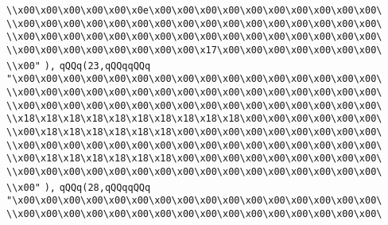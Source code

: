 \verb|\\x00\x00\x00\x00\x00\x0e\x00\x00\x00\x00\x00\x00\x00\x00\x00\x00\|\newline
\verb|\\x00\x00\x00\x00\x00\x00\x00\x00\x00\x00\x00\x00\x00\x00\x00\x00\|\newline
\verb|\\x00\x00\x00\x00\x00\x00\x00\x00\x00\x00\x00\x00\x00\x00\x00\x00\|\newline
\verb|\\x00\x00\x00\x00\x00\x00\x00\x00\x17\x00\x00\x00\x00\x00\x00\x00\|\newline
\verb|\\x00"|\newline
\verb|),|\newline
\verb|qQQq(23,qQQqqQQq|\newline
\verb|"\x00\x00\x00\x00\x00\x00\x00\x00\x00\x00\x00\x00\x00\x00\x00\x00\|\newline
\verb|\\x00\x00\x00\x00\x00\x00\x00\x00\x00\x00\x00\x00\x00\x00\x00\x00\|\newline
\verb|\\x00\x00\x00\x00\x00\x00\x00\x00\x00\x00\x00\x00\x00\x00\x00\x00\|\newline
\verb|\\x18\x18\x18\x18\x18\x18\x18\x18\x18\x18\x00\x00\x00\x00\x00\x00\|\newline
\verb|\\x00\x18\x18\x18\x18\x18\x18\x00\x00\x00\x00\x00\x00\x00\x00\x00\|\newline
\verb|\\x00\x00\x00\x00\x00\x00\x00\x00\x00\x00\x00\x00\x00\x00\x00\x00\|\newline
\verb|\\x00\x18\x18\x18\x18\x18\x18\x00\x00\x00\x00\x00\x00\x00\x00\x00\|\newline
\verb|\\x00\x00\x00\x00\x00\x00\x00\x00\x00\x00\x00\x00\x00\x00\x00\x00\|\newline
\verb|\\x00"|\newline
\verb|),|\newline
\verb|qQQq(28,qQQqqQQq|\newline
\verb|"\x00\x00\x00\x00\x00\x00\x00\x00\x00\x00\x00\x00\x00\x00\x00\x00\|\newline
\verb|\\x00\x00\x00\x00\x00\x00\x00\x00\x00\x00\x00\x00\x00\x00\x00\x00\|\newline
